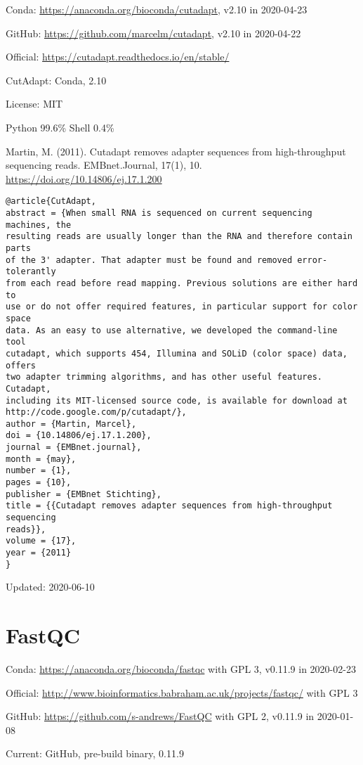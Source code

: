 \documentclass[]{article}
\begin{document}
Conda: \url{https://anaconda.org/bioconda/cutadapt}, v2.10 in 2020-04-23

GitHub: \url{https://github.com/marcelm/cutadapt}, v2.10 in 2020-04-22

Official: \url{https://cutadapt.readthedocs.io/en/stable/}

CutAdapt: Conda, 2.10

License: MIT

Python 99.6\% Shell 0.4\%

Martin, M. (2011). Cutadapt removes adapter sequences from high-throughput sequencing reads. EMBnet.Journal, 17(1), 10. \url{https://doi.org/10.14806/ej.17.1.200}

\begin{verbatim}
@article{CutAdapt,
abstract = {When small RNA is sequenced on current sequencing machines, the
resulting reads are usually longer than the RNA and therefore contain parts
of the 3' adapter. That adapter must be found and removed error-tolerantly
from each read before read mapping. Previous solutions are either hard to
use or do not offer required features, in particular support for color space
data. As an easy to use alternative, we developed the command-line tool
cutadapt, which supports 454, Illumina and SOLiD (color space) data, offers
two adapter trimming algorithms, and has other useful features.   Cutadapt,
including its MIT-licensed source code, is available for download at
http://code.google.com/p/cutadapt/},
author = {Martin, Marcel},
doi = {10.14806/ej.17.1.200},
journal = {EMBnet.journal},
month = {may},
number = {1},
pages = {10},
publisher = {EMBnet Stichting},
title = {{Cutadapt removes adapter sequences from high-throughput sequencing
reads}},
volume = {17},
year = {2011}
}
\end{verbatim}

Updated: 2020-06-10

\section{FastQC}

Conda: \url{https://anaconda.org/bioconda/fastqc} with GPL 3, v0.11.9 in 2020-02-23

Official: \url{http://www.bioinformatics.babraham.ac.uk/projects/fastqc/} with GPL 3

GitHub: \url{https://github.com/s-andrews/FastQC} with GPL 2, v0.11.9 in 2020-01-08

Current: GitHub, pre-build binary, 0.11.9
\end{document}

